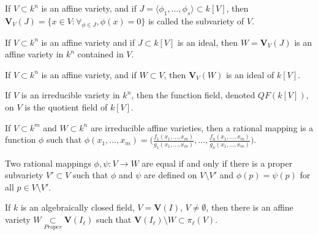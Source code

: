 \documentclass[../main.tex]{subfiles}
\begin{document}
\begin{definition}
If $V\subset k^n$ is an affine variety, and if $J = \langle \phi_1,\hdots, \phi_s\rangle \subset k[V]$, then $\textbf{V}_{V}(J) = \{x\in V:\forall_{\phi \in J}, \phi(x) = 0 \}$ is called the subvariety of $V$.
\end{definition}

\begin{theorem}
If $V\subset k^n$ is an affine variety and if $J\subset k[V]$ is an ideal, then $W = \textbf{V}_{V}(J)$ is an affine variety in $k^n$ contained in $V$.
\end{theorem}

\begin{theorem}
If $V\subset k^n$ is an affine variety, and if $W\subset V$, then $\textbf{V}_{V}(W)$ is an ideal of $k[V]$.
\end{theorem}

\begin{definition}
If $V$ is an irreducible variety in $k^n$, then the function field, denoted $QF(k[V])$, on $V$ is the quotient field of $k[V]$.
\end{definition}

\begin{definition}
If $V\subset k^m$ and $W\subset k^n$ are irreducible affine varieties, then a rational mapping is a function $\phi$ such that $\phi(x_1,\hdots, x_m) = \bigg(\frac{f_1(x_1,\hdots, x_m)}{g_1(x_1,\hdots, x_m)}, \hdots, \frac{f_n(x_1,\hdots, x_m)}{g_n(x_1,\hdots, x_m)}\bigg)$.
\end{definition}

\begin{theorem}
Two rational mappings $\phi,\psi:V\rightarrow W$ are equal if and only if there is a proper subvariety $V'\subset V$ such that $\phi$ and $\psi$ are defined on $V\setminus V'$ and $\phi(p) = \psi(p)$ for all $p \in V\setminus V'$.
\end{theorem}

\begin{theorem}
If $k$ is an algebraically closed field, $V=\textbf{V}(I)$, $V\ne \emptyset$, then there is an affine variety $W\underset{Proper}\subset \textbf{V}(I_{\ell})$ such that $\textbf{V}(I_{\ell})\setminus W \subset \pi_{\ell}(V)$.
\end{theorem}
\end{document}
